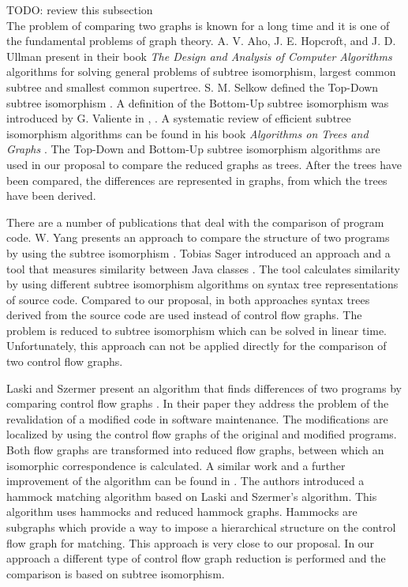 TODO: review this subsection
\\
The problem of comparing two graphs is known for a long time 
and it is one of the fundamental problems of graph theory.
A. V. Aho, J. E. Hopcroft, and J. D. Ullman present in their book \textit{The Design and
Analysis of Computer Algorithms}  \cite{aho_hopcroft_ulman_algorithms}
algorithms for solving
general problems of subtree isomorphism, largest common subtree and smallest common supertree.
%
S. M. Selkow defined the Top-Down subtree isomorphism \cite{selkow_tree_top_down}.
A definition of  the Bottom-Up subtree isomorphism was introduced by G. Valiente 
in  \cite{valiente_tree_bottom_up_1}, \cite{valiente_tree_bottom_up_2}.
A systematic review of efficient subtree isomorphism algorithms can be found in his book
\textit{Algorithms on Trees and Graphs} \cite{Valiente_algorithms_tree}.
%
The Top-Down and Bottom-Up subtree isomorphism algorithms are used in our proposal
to compare the reduced graphs as trees.
After the trees have been  compared, the differences are represented 
in graphs, from which the trees have been derived.

There are a number of publications that deal with the comparison of program code.
W. Yang presents an approach  to compare the structure of two programs by using the subtree isomorphism 
\cite{yang_tree_top_down}.
%
Tobias Sager introduced an approach and a tool that measures similarity 
between Java classes \cite{dipl_thesis_sager}.
The tool calculates similarity by using different subtree isomorphism algorithms 
on syntax tree representations of source code.
%
Compared to our proposal, in both approaches syntax trees derived from the source code are used 
instead of control flow graphs. 
The problem is reduced to subtree isomorphism which can be solved in linear time. 
Unfortunately, this approach can not be applied directly for the comparison of two control flow graphs.

Laski and Szermer present an algorithm that  finds differences 
of two programs by comparing control flow graphs
\cite{laski_szemer_prog_modification}. 
In their paper they address the problem of the revalidation of a modified code in software maintenance.
The modifications are localized by using the control flow graphs of the original and modified programs. 
Both flow graphs are transformed into reduced flow graphs, 
between which an isomorphic correspondence is calculated.
%
A similar work and a further improvement of the algorithm can be found in \cite{apiwattanapong_orso_jdiff}.
The authors introduced a hammock matching algorithm  based on Laski and Szermer's algorithm.
%
This algorithm uses hammocks and reduced hammock graphs.
Hammocks are subgraphs \cite{ferrante_hamock} which provide a way to impose 
a hierarchical structure on the control flow graph for matching.
%
This approach is very close to our proposal.
In our approach a different type of control flow graph reduction is performed
and the comparison is based on subtree isomorphism.

